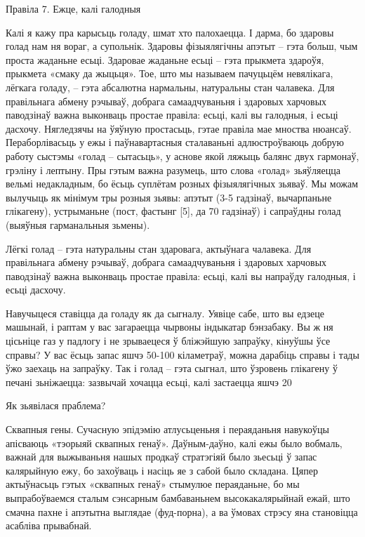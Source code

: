 Правіла 7. Ежце, калі галодныя

Калі я кажу пра карысьць голаду, шмат хто палохаецца. І дарма, бо здаровы голад нам ня вораг, а супольнік. Здаровы фізыялягічны апэтыт – гэта больш, чым проста жаданьне есьці. Здаровае жаданьне есьці – гэта прыкмета здароўя, прыкмета «смаку да жыцьця». Тое, што мы называем пачуцьцём невялікага, лёгкага голаду, – гэта абсалютна нармальны, натуральны стан чалавека. Для правільнага абмену рэчываў, добрага самаадчуваньня і здаровых харчовых паводзінаў важна выконваць простае правіла: есьці, калі вы галодныя, і есьці дасхочу. Нягледзячы на ўяўную простасьць, гэтае правіла мае мноства нюансаў.
Пераборлівасьць у ежы і паўнавартасныя сталаваньні адлюстроўваюць добрую работу сыстэмы «голад – сытасьць», у аснове якой ляжыць балянс двух гармонаў, грэліну і лептыну. Пры гэтым важна разумець, што слова «голад» зьяўляецца вельмі недакладным, бо ёсьць суплётам розных фізыялягічных зьяваў. Мы можам вылучыць як мінімум тры розныя зьявы: апэтыт (3-5 гадзінаў, вычарпаньне глікагену), устрыманьне (пост, фастынг [5], да 70 гадзінаў) і сапраўдны голад (выяўныя гарманальныя зьмены).

Лёгкі голад – гэта натуральны стан здаровага, актыўнага чалавека. Для правільнага абмену рэчываў, добрага самаадчуваньня і здаровых харчовых паводзінаў важна выконваць простае правіла: есьці, калі вы напраўду галодныя, і есьці дасхочу.

Навучыцеся ставіцца да голаду як да сыгналу. Уявіце сабе, што вы едзеце машынай, і раптам у вас загараецца чырвоны індыкатар бэнзабаку. Вы ж ня цісьніце газ у падлогу і не зрываецеся ў бліжэйшую запраўку, кінуўшы ўсе справы? У вас ёсьць запас яшчэ 50-100 кіламетраў, можна дарабіць справы і тады ўжо заехаць на запраўку. Так і голад – гэта сыгнал, што ўзровень глікагену ў печані зьніжаецца: зазвычай хочацца есьці, калі застаецца яшчэ 20%

Як зьявілася праблема?

Сквапныя гены.
Сучасную эпідэмію атлусьценьня і пераяданьня навукоўцы апісваюць «тэорыяй сквапных генаў». Даўным-даўно, калі ежы было вобмаль, важнай для выжываньня нашых продкаў стратэгіяй было зьесьці ў запас калярыйную ежу, бо захоўваць і насіць яе з сабой было складана. Цяпер актыўнасьць гэтых «сквапных генаў» стымулюе пераяданьне, бо мы выпрабоўваемся сталым сэнсарным бамбаваньнем высокакалярыйнай ежай, што смачна пахне і апэтытна выглядае (фуд-порна), а ва ўмовах стрэсу яна становіцца асабліва прывабнай.

